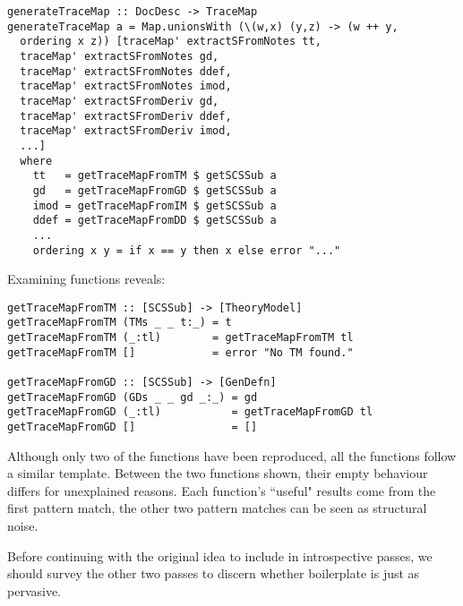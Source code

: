 \begin{tcolorbox}
\begin{verbatim}
generateTraceMap :: DocDesc -> TraceMap
generateTraceMap a = Map.unionsWith (\(w,x) (y,z) -> (w ++ y,
  ordering x z)) [traceMap' extractSFromNotes tt,
  traceMap' extractSFromNotes gd,
  traceMap' extractSFromNotes ddef,
  traceMap' extractSFromNotes imod,
  traceMap' extractSFromDeriv gd,
  traceMap' extractSFromDeriv ddef,
  traceMap' extractSFromDeriv imod,
  ...]
  where
    tt   = getTraceMapFromTM $ getSCSSub a
    gd   = getTraceMapFromGD $ getSCSSub a
    imod = getTraceMapFromIM $ getSCSSub a
    ddef = getTraceMapFromDD $ getSCSSub a
    ...
    ordering x y = if x == y then x else error "..."
\end{verbatim}
\end{tcolorbox}


Examining  functions reveals:

\begin{tcolorbox}[breakable, toprule at break=0pt, bottomrule at break=0pt]
\begin{verbatim}
getTraceMapFromTM :: [SCSSub] -> [TheoryModel]
getTraceMapFromTM (TMs _ _ t:_) = t
getTraceMapFromTM (_:tl)        = getTraceMapFromTM tl
getTraceMapFromTM []            = error "No TM found."

getTraceMapFromGD :: [SCSSub] -> [GenDefn]
getTraceMapFromGD (GDs _ _ gd _:_) = gd
getTraceMapFromGD (_:tl)           = getTraceMapFromGD tl
getTraceMapFromGD []               = []
\end{verbatim}
\end{tcolorbox}

Although only two of the functions have been reproduced, all the  functions follow a similar template. Between the two functions shown, their empty behaviour differs for unexplained reasons. Each function's ``useful" results come from the first pattern match, the other two pattern matches can be seen as structural noise. 

Before continuing with the original idea to include  in introspective  passes, we should survey the other two passes to discern whether boilerplate is just as pervasive.

